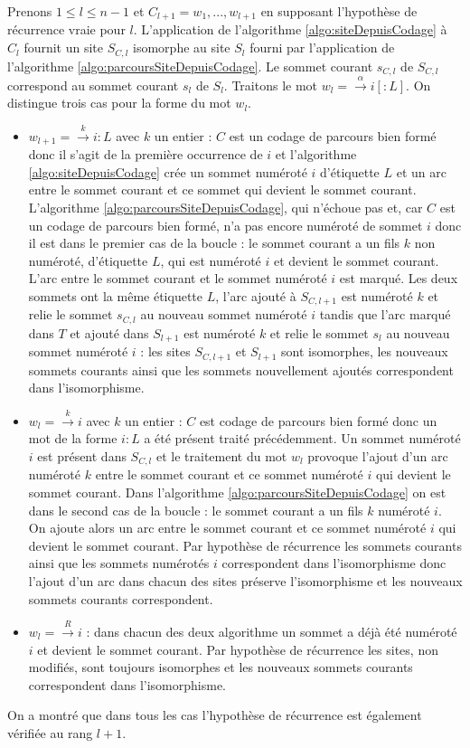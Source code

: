 \begin{pr}
Prenons $1\leq l\leq n-1$ et $C_{l+1}=w_1, ..., w_{l+1}$ en supposant l'hypothèse de récurrence vraie pour $l$.
L'application de l'algorithme \ref{algo:siteDepuisCodage} à $C_l$ fournit un site $S_{C,l}$ isomorphe au site $S_l$ fourni par l'application de l'algorithme \ref{algo:parcoursSiteDepuisCodage}. Le sommet courant $s_{C,l}$ de $S_{C,l}$ correspond au sommet courant $s_l$ de $S_l$. Traitons le mot $w_l=\xrightarrow{\alpha}i[:L]$.
On distingue trois cas pour la forme du mot $w_l$.
\begin{itemize}
 \item $w_{l+1}=\xrightarrow{k}i:L$ avec $k$ un entier : $C$ est un codage de parcours bien formé donc il s'agit de la première occurrence de $i$ et l'algorithme \ref{algo:siteDepuisCodage} crée un sommet numéroté $i$ d'étiquette $L$ et un arc entre le sommet courant et ce sommet qui devient le sommet courant. 
 L'algorithme \ref{algo:parcoursSiteDepuisCodage}, qui n'échoue pas et, car $C$ est un codage de parcours bien formé, n'a pas encore numéroté de sommet $i$ donc il est dans le premier cas de la boucle : le sommet courant a un fils $k$ non numéroté, d'étiquette $L$, qui est numéroté $i$ et devient le sommet courant. L'arc entre le sommet courant et le sommet numéroté $i$ est marqué. 
 Les deux sommets ont la même étiquette $L$, l'arc ajouté à $S_{C,l+1}$ est numéroté $k$ et relie le sommet $s_{C,l}$ au nouveau sommet numéroté $i$ tandis que l'arc marqué dans $T$ et ajouté dans $S_{l+1}$ est numéroté $k$ et relie le sommet $s_l$ au nouveau sommet numéroté $i$ : les sites $S_{C,l+1}$ et $S_{l+1}$ sont isomorphes, les nouveaux sommets courants ainsi que les sommets nouvellement ajoutés correspondent dans l'isomorphisme.
 \item $w_l=\xrightarrow{k}i$ avec $k$ un entier : $C$ est codage de parcours bien formé donc un mot de la forme $i:L$ a été présent traité précédemment. Un sommet numéroté $i$ est présent dans $S_{C,l}$ et le traitement du mot $w_l$ provoque l'ajout d'un arc numéroté $k$ entre le sommet courant et ce sommet numéroté $i$ qui devient le sommet courant. Dans l'algorithme \ref{algo:parcoursSiteDepuisCodage} on est dans le second cas de la boucle : le sommet courant a un fils $k$ numéroté $i$. On ajoute alors un arc entre le sommet courant et ce sommet numéroté $i$ qui devient le sommet courant. Par hypothèse de récurrence les sommets courants ainsi que les sommets numérotés $i$ correspondent dans l'isomorphisme donc l'ajout d'un arc dans chacun des sites préserve l'isomorphisme et les nouveaux sommets courants correspondent.
 \item $w_l=\xrightarrow{R}i$ : dans chacun des deux algorithme un sommet a déjà été numéroté $i$ et devient le sommet courant. Par hypothèse de récurrence les sites, non modifiés, sont toujours isomorphes et les nouveaux sommets courants correspondent dans l'isomorphisme.
\end{itemize}
On a montré que dans tous les cas l'hypothèse de récurrence est également vérifiée au rang $l+1$.
\end{pr}

